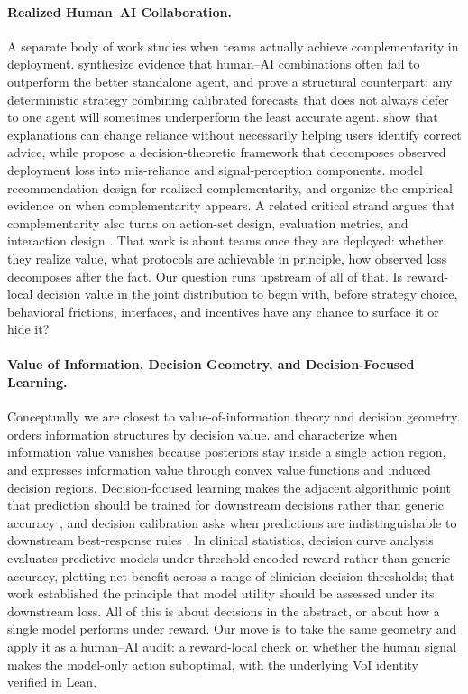 \paragraph{Realized Human--AI Collaboration.}
A separate body of work studies when teams actually achieve complementarity in deployment.
\citet{Vaccaro2024} synthesize evidence that human--AI combinations often fail to outperform the better standalone agent, and \citet{PengGargKleinberg2025} prove a structural counterpart: any deterministic strategy combining calibrated forecasts that does not always defer to one agent will sometimes underperform the least accurate agent.
\citet{SchoefferEtAl2024} show that explanations can change reliance without necessarily helping users identify correct advice, while \citet{GuoEtAl2024reliance} propose a decision-theoretic framework that decomposes observed deployment loss into mis-reliance and signal-perception components.
\citet{McLaughlinSpiess2024} model recommendation design for realized complementarity, and \citet{HemmerEtAl2025} organize the empirical evidence on when complementarity appears.
A related critical strand argues that complementarity also turns on action-set design, evaluation metrics, and interaction design \citep{StraitouriEtAl2025}.
That work is about teams once they are deployed: whether they realize value, what protocols are achievable in principle, how observed loss decomposes after the fact. Our question runs upstream of all of that. Is reward-local decision value in the joint distribution to begin with, before strategy choice, behavioral frictions, interfaces, and incentives have any chance to surface it or hide it?

\paragraph{Value of Information, Decision Geometry, and Decision-Focused Learning.}
Conceptually we are closest to value-of-information theory and decision geometry.
\citet{Blackwell1951} orders information structures by decision value. \citet{RadnerStiglitz1984} and \citet{DeLaraGossner2020} characterize when information value vanishes because posteriors stay inside a single action region, and \citet{KamenicaGentzkow2011} expresses information value through convex value functions and induced decision regions.
Decision-focused learning makes the adjacent algorithmic point that prediction should be trained for downstream decisions rather than generic accuracy \citep{Elmachtoub2022,Wilder2019}, and decision calibration asks when predictions are indistinguishable to downstream best-response rules \citep{Zhao2021}.
In clinical statistics, decision curve analysis \citep{Vickers2006} evaluates predictive models under threshold-encoded reward rather than generic accuracy, plotting net benefit across a range of clinician decision thresholds; that work established the principle that model utility should be assessed under its downstream loss.
All of this is about decisions in the abstract, or about how a single model performs under reward. Our move is to take the same geometry and apply it as a human--AI audit: a reward-local check on whether the human signal makes the model-only action suboptimal, with the underlying VoI identity verified in Lean.
